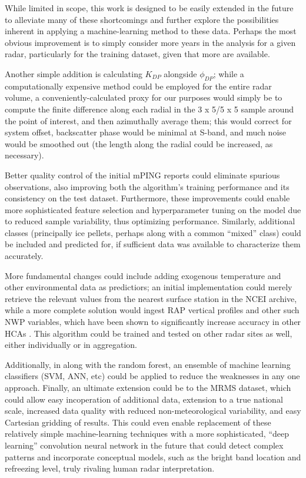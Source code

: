 \documentclass{agujournal}
\begin{document}
While limited in scope, this work is designed to be easily extended in the future to alleviate many of these shortcomings and further explore the possibilities inherent in applying a machine-learning method to these data. Perhaps the most obvious improvement is to simply consider more years in the analysis for a given radar, particularly for the training dataset, given that more are available.

Another simple addition is calculating $K_{DP}$ alongside $\phi_{DP}$; while a computationally expensive method could be employed for the entire radar volume, a conveniently-calculated proxy for our purposes would simply be to compute the finite difference along each radial in the 3 x 5/5 x 5 sample around the point of interest, and then azimuthally average them; this would correct for system offset, backscatter phase would be minimal at S-band, and much noise would be smoothed out (the length along the radial could be increased, as necessary).

Better quality control of the initial mPING reports could eliminate spurious observations, also improving both the algorithm's training performance and its consistency on the test dataset. Furthermore, these improvements could enable more sophisticated feature selection and hyperparameter tuning on the model due to reduced sample variability, thus optimizing performance. Similarly, additional classes (principally ice pellets, perhaps along with a common ``mixed'' class) could be included and predicted for, if sufficient data was available to characterize them accurately.

More fundamental changes could include adding exogenous temperature and other environmental data as predictiors; an initial implementation could merely retrieve the relevant values from the nearest surface station in the NCEI archive, while a more complete solution would ingest RAP vertical  profiles and other such NWP variables, which have been shown to significantly increase accuracy in other HCAs \parencite{Schuur2012}. This algorithm could be trained and tested on other radar sites as well, either individually or in aggregation.

Additionally, in along with the random forest, an ensemble of machine learning classifiers (SVM, ANN, etc) could be applied to reduce the weaknesses in any one approach. Finally, an ultimate extension could be to the MRMS dataset, which could allow easy incoperation of additional data, extension to a true national scale, increased data quality with reduced non-meteorological variability, and easy Cartesian gridding of results. This could even enable replacement of these relatively simple machine-learning techniques with a more sophisticated, ``deep learning'' convolution neural network in the future that could detect complex patterns and incorporate conceptual models, such as the bright band location and refreezing level, truly rivaling human radar interpretation.
\end{document}
